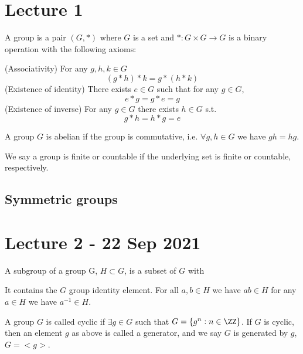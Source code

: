 \documentclass[11pt]{scrartcl}
\begin{document}
\section{Lecture 1}

\begin{definition}
  A group is a pair $(G,*)$ where $G$ is a set and $*:G\times G\to G$ is a binary
  operation with the following axioms:
  \begin{itemize}
      \ii (Associativity) For any $g,h,k\in G$
      \[(g*h)*k = g*(h*k)\]
      \ii (Existence of identity) There exists $e\in G$ such that for any $g\in G$,
      \[e*g=g*e = g\]
      \ii (Existence of inverse) For any $g\in G$ there exists $h\in G$ s.t.
      \[g*h=h*g=e\]
  \end{itemize}
  \label{group}
\end{definition}

\begin{definition}
  A group $G$ is abelian if the group is commutative, i.e. $\forall g,h\in G$ we have
  $gh=hg$.
  \label{abelianGroup}
\end{definition}

\begin{definition}
  We say a group is finite or countable if the underlying set is finite or countable,
  respectively.
\end{definition}

\subsection{Symmetric groups}

\section{Lecture 2 - 22 Sep 2021}

\begin{definition}
   A subgroup of a group G, $H\subset G$, is a subset of $G$ with
   \begin{itemize}
       \ii It contains the $G$ group identity element.
       \ii For all $a,b\in H$ we have $ab\in H$
       \ii for any $a\in H$ we have $a^{-1}\in H$.
   \end{itemize}
   \label{subgroup}
 
\end{definition}

\begin{definition}
  A group $G$ is called cyclic if $\exists g\in G$ such that $G=\left\{ g^n : n\in\ZZ
  \right\}$. If $G$ is cyclic, then an element $g$ as above is called a generator, and we
  say $G$ is generated by $g$, $G=<g>$.
  \label{cyclicGroup}
\end{definition}
\end{document}
